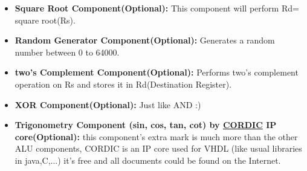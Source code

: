 \documentclass{report}
\begin{document}
\begin{itemize}
	\item \textbf{Square Root Component(Optional):}
		This component will perform Rd= square root(Rs).
	\item \textbf{Random Generator Component(Optional):}
		Generates a random number between 0 to 64000.
	\item \textbf{two’s Complement Component(Optional):}
		Performs two's complement operation on Rs and stores it in Rd(Destination Register).
	\item \textbf{XOR Component(Optional):}
		Just like AND :)
	\item \textbf{Trigonometry Component (sin, cos, tan, cot) by \href{https://en.wikipedia.org/wiki/CORDIC}{CORDIC} IP core(Optional):}
		this component’s extra mark is much more than the other ALU components, 			CORDIC is an IP core used for VHDL (like usual libraries in java,C,...) it’s free and all 			documents could be found on the Internet.
\end{itemize}
\end{document}
